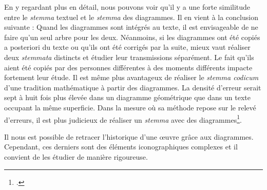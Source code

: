 En y regardant plus en détail, nous pouvons voir qu'il y a une forte similitude entre le \textit{stemma} textuel et le \textit{stemma} des diagrammes. Il en vient à la conclusion suivante : Quand les diagrammes sont intégrés au texte, il est envisageable de ne faire qu'un seul arbre pour les deux. Néanmoins, si les diagrammes ont été copiés a posteriori du texte ou qu'ils ont été corrigés par la suite, mieux vaut réaliser deux \textit{stemmata} distincts et étudier leur transmissions séparément. Le fait qu'ils aient été copiés par des personnes différentes à des moments différents impacte fortement leur étude. Il est même plus avantageux de réaliser le \textit{stemma codicum} d'une tradition mathématique à partir des diagrammes. La densité d'erreur serait sept à huit fois plus élevée dans un diagramme géométrique que dans un texte occupant la même superficie. Dans la mesure où sa méthode repose sur le relevé d'erreurs, il est plus judicieux de réaliser un \textit{stemma} avec des diagrammes\footcite{raynaudBuildingStemmaCodicum2014}.

Il nous est possible de retracer l'historique d'une œuvre grâce aux diagrammes. Cependant, ces derniers sont des éléments iconographiques complexes et il convient de les étudier de manière rigoureuse.